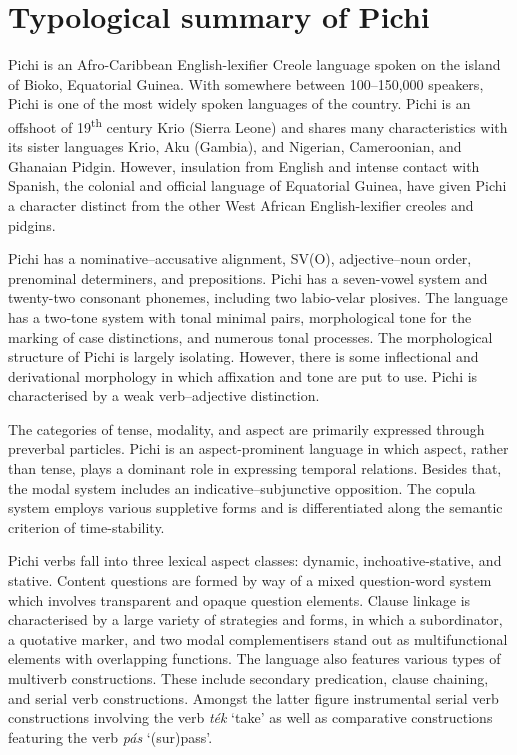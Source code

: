 \chapter{Typological summary of Pichi}

Pichi is an Afro-Caribbean English-lexifier Creole language spoken on the island of Bioko, Equatorial Guinea. With somewhere between 100–150,000 speakers, Pichi is one of the most widely spoken languages of the country. Pichi is an offshoot of 19\textsuperscript{th} century Krio (Sierra Leone) and shares many characteristics with its sister languages Krio, Aku (Gambia), and Nigerian, Cameroonian, and Ghanaian Pidgin. However, insulation from English and intense contact with Spanish, the colonial and official language of Equatorial Guinea, have given Pichi a character distinct from the other West African English-lexifier creoles and pidgins. 


Pichi has a nominative–accusative alignment, SV(O), adjective–noun order, prenominal determiners, and prepositions. Pichi has a seven-vowel system and twenty-two consonant phonemes, including two labio-velar plosives. The language has a two-tone system with tonal minimal pairs, morphological tone for the marking of case distinctions, and numerous tonal processes. The morphological structure of Pichi is largely isolating. However, there is some inflectional and derivational morphology in which affixation and tone are put to use. Pichi is characterised by a weak verb–adjective distinction. 



The categories of tense, modality, and aspect are primarily expressed through preverbal particles. Pichi is an aspect-prominent language in which aspect, rather than tense, plays a dominant role in expressing temporal relations. Besides that, the modal system includes an indicative–subjunctive opposition. The copula system employs various suppletive forms and is differentiated along the semantic criterion of time-stability.



Pichi verbs fall into three lexical aspect classes: dynamic, inchoative-stative, and stative. Content questions are formed by way of a mixed question-word system which involves transparent and opaque question elements. Clause linkage is characterised by a large variety of strategies and forms, in which a subordinator, a quotative marker, and two modal complementisers stand out as multifunctional elements with overlapping functions. The language also features various types of multiverb constructions. These include secondary predication, clause chaining, and serial verb constructions. Amongst the latter figure instrumental serial verb constructions involving the verb \textit{ték} ‘take’ as well as comparative constructions featuring the verb \textit{pás} ‘(sur)pass’. 



